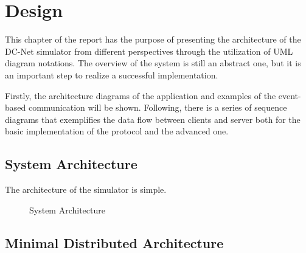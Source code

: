 \chapter{Design}
This chapter of the report has the purpose of presenting the architecture of the DC-Net simulator from different perspectives through the utilization of UML diagram notations. The overview of the system is still an abstract one, but it is an important step to realize a successful implementation. 

Firstly, the architecture diagrams of the application and examples of the event-based communication will be shown. Following, there is a series of sequence diagrams that exemplifies the data flow between clients and server both for the basic implementation of the protocol and the advanced one.


\section{System Architecture}
The architecture of the simulator is simple.  

\begin{figure}[H]
    \centering
    \caption{System Architecture}
    \label{fig:systemArchitecture}
\end{figure}


\section{Minimal Distributed Architecture}

